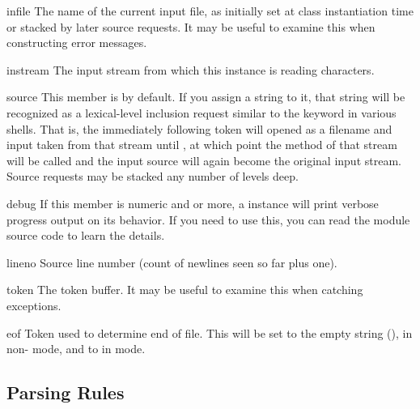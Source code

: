 \begin{memberdesc}{infile}
The name of the current input file, as initially set at class
instantiation time or stacked by later source requests.  It may
be useful to examine this when constructing error messages.
\end{memberdesc}

\begin{memberdesc}{instream}
The input stream from which this  instance is reading
characters.
\end{memberdesc}

\begin{memberdesc}{source}
This member is  by default.  If you assign a string to it,
that string will be recognized as a lexical-level inclusion request
similar to the  keyword in various shells.  That is, the
immediately following token will opened as a filename and input taken
from that stream until \EOF, at which point the 
method of that stream will be called and the input source will again
become the original input stream. Source requests may be stacked any
number of levels deep.
\end{memberdesc}

\begin{memberdesc}{debug}
If this member is numeric and  or more, a 
instance will print verbose progress output on its behavior.  If you
need to use this, you can read the module source code to learn the
details.
\end{memberdesc}

\begin{memberdesc}{lineno}
Source line number (count of newlines seen so far plus one).
\end{memberdesc}

\begin{memberdesc}{token}
The token buffer.  It may be useful to examine this when catching
exceptions.
\end{memberdesc}

\begin{memberdesc}{eof}
Token used to determine end of file. This will be set to the empty
string (), in non-\POSIX{} mode, and to  in
\POSIX{} mode.
\end{memberdesc}

\subsection{Parsing Rules\label{shlex-parsing-rules}}

